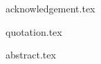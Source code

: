 
{acknowledgement.tex}


{quotation.tex}

{abstract.tex}


\pagestyle{fancy} %

\tableofcontents %

\listoffigures %

\listoftables %



%
%


